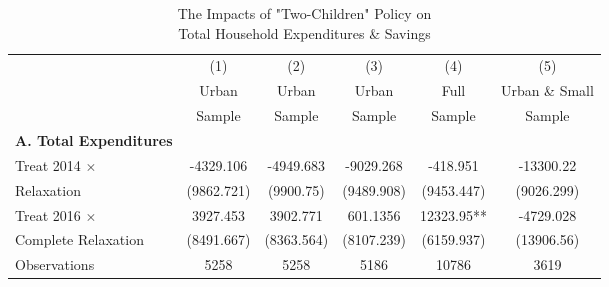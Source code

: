 \documentclass[12pt]{extarticle}
\begin{document}
\begin{table}
\centering
\caption{The Impacts of "Two-Children" Policy on \\ Total Household Expenditures \& Savings} \label{tab:totalexp}
\begin{threeparttable}
\def\sym#1{\ifmmode^{#1}\else\(^{#1}\)\fi}
\begin{tabular}{l*{5}{c}}
\hline\hline
                    &\multicolumn{1}{c}{(1)}&\multicolumn{1}{c}{(2)}&\multicolumn{1}{c}{(3)}&\multicolumn{1}{c}{(4)}&\multicolumn{1}{c}{(5)}\\
	                &\multicolumn{1}{c}{Urban}&\multicolumn{1}{c}{Urban}&\multicolumn{1}{c}{Urban}&\multicolumn{1}{c}{Full}&\multicolumn{1}{c}{Urban \& Small}\\
		&\multicolumn{1}{c}{Sample}&\multicolumn{1}{c}{Sample}&\multicolumn{1}{c}{Sample}&\multicolumn{1}{c}{Sample}&\multicolumn{1}{c}{Sample}\\
\hline
\textbf{A. Total Expenditures}\\
Treat 2014 $\times$ &   -4329.106   &   -4949.683   &   -9029.268   &    -418.951   &   -13300.22   \\
\quad 2014 Relaxation     &  (9862.721)   &   (9900.75)   &  (9489.908)   &  (9453.447)   &  (9026.299)   \\
Treat 2016 $\times$ &    3927.453   &    3902.771   &    601.1356   &    12323.95** &   -4729.028   \\
\quad Complete Relaxation &  (8491.667)   &  (8363.564)   &  (8107.239)   &  (6159.937)   &  (13906.56)   \\
Observations        &        5258   &        5258   &        5186   &       10786   &        3619   \\


\end{tabular}
\end{threeparttable}
\end{table}
\end{document}
